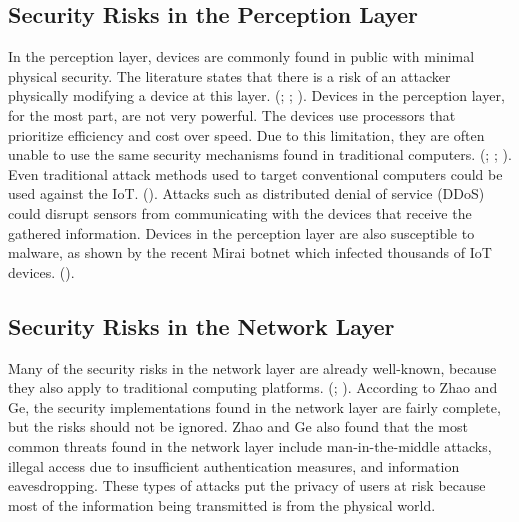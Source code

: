 \documentclass[letterpaper, 12pt]{article}
\begin{document}
\begin{flushleft}
\subsection*{Security Risks in the Perception Layer}
In the perception layer, devices are commonly found in public with minimal physical security. The literature states that there is a risk of an attacker physically
modifying a device at this layer. (\cite{Zhao6746513}; \cite{Xiaohui6643029}; \cite{Suo6188257}). Devices in the perception layer, for the most part,
are not very powerful. The devices use processors that prioritize efficiency and cost over speed. Due to this limitation, they are often unable to use the same security mechanisms found in traditional computers. 
(\cite{Suo6188257}; \cite{Granjal7005393}; \cite{Xiaohui6643029}). Even traditional attack methods used to target conventional computers could be 
used against the IoT. (\cite{Zhao6746513}). Attacks such as distributed denial of service (DDoS) could disrupt sensors from communicating with the devices that receive the gathered information. Devices in the perception layer are also susceptible to malware, as shown by the recent Mirai
botnet which infected thousands of IoT devices. (\cite{Incapsula}). 

\subsection*{Security Risks in the Network Layer}
Many of the security risks in the network layer are already well-known, because they also apply to traditional computing platforms. 
(\cite{Zhao6746513}; \cite{Xiaohui6643029}). According to Zhao and Ge, the security implementations found in the network layer are fairly complete, but
the risks should not be ignored. Zhao and Ge also found that the most common threats found in the network layer include man-in-the-middle attacks, illegal access due to 
insufficient authentication measures, and information eavesdropping. These types of attacks put the privacy of users at risk because most of the 
information being transmitted is from the physical world.


\end{flushleft}
\end{document}
